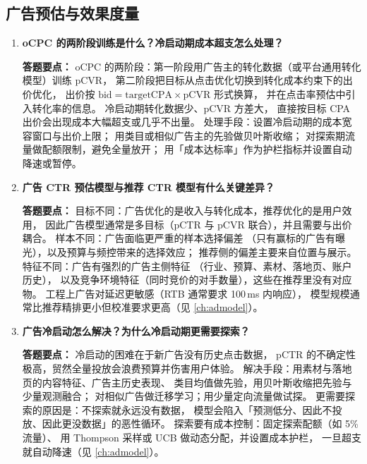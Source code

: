 \subsection{广告预估与效果度量}

\begin{interview}[题库与答题要点]

\begin{enumerate}[label=]

  \item[\textcolor{VioletDeep}{\textbf{Q65.}}] \textbf{oCPC 的两阶段训练是什么？冷启动期成本超支怎么处理？}
\par\smallskip\noindent\textcolor{VioletDeep}{\textbf{答题要点：}}
oCPC 的两阶段：第一阶段用广告主的转化数据（或平台通用转化模型）训练 pCVR，
第二阶段把目标从点击优化切换到转化成本约束下的出价优化，
出价按 $\text{bid} = \text{targetCPA}\times\text{pCVR}$ 形式换算，
并在点击率预估中引入转化率的信息。
冷启动期转化数据少、pCVR 方差大，
直接按目标 CPA 出价会出现成本大幅超支或几乎不出量。
处理手段：设置冷启动期的成本宽容窗口与出价上限；
用类目或相似广告主的先验做贝叶斯收缩；
对探索期流量做配额限制，避免全量放开；
用「成本达标率」作为护栏指标并设置自动降速或暂停。

  \item[\textcolor{VioletDeep}{\textbf{Q66.}}] \textbf{广告 CTR 预估模型与推荐 CTR 模型有什么关键差异？}
\par\smallskip\noindent\textcolor{VioletDeep}{\textbf{答题要点：}}
目标不同：广告优化的是收入与转化成本，推荐优化的是用户效用，
因此广告模型通常是多目标（pCTR 与 pCVR 联合），并且需要与出价耦合。
样本不同：广告面临更严重的样本选择偏差
（只有赢标的广告有曝光），以及预算与频控带来的选择效应；
推荐侧的偏差主要来自位置与展示。
特征不同：广告有强烈的广告主侧特征
（行业、预算、素材、落地页、账户历史），
以及竞争环境特征（同时竞价的对手数量），这些在推荐里没有对应物。
工程上广告对延迟更敏感（RTB 通常要求 100\,ms 内响应），
模型规模通常比推荐精排更小但校准要求更高（见 \cref{ch:admodel}）。

  \item[\textcolor{VioletDeep}{\textbf{Q67.}}] \textbf{广告冷启动怎么解决？为什么冷启动期更需要探索？}
\par\smallskip\noindent\textcolor{VioletDeep}{\textbf{答题要点：}}
冷启动的困难在于新广告没有历史点击数据，
pCTR 的不确定性极高，贸然全量投放会浪费预算并伤害用户体验。
解决手段：用素材与落地页的内容特征、广告主历史表现、
类目均值做先验，用贝叶斯收缩把先验与少量观测融合；
对相似广告做迁移学习；用少量定向流量做试探。
更需要探索的原因是：不探索就永远没有数据，
模型会陷入「预测低分、因此不投放、因此更没数据」的恶性循环。
探索要有成本控制：固定探索配额（如 5\% 流量）、
用 Thompson 采样或 UCB 做动态分配，并设置成本护栏，
一旦超支就自动降速（见 \cref{ch:admodel}）。


\end{enumerate}
\end{interview}
